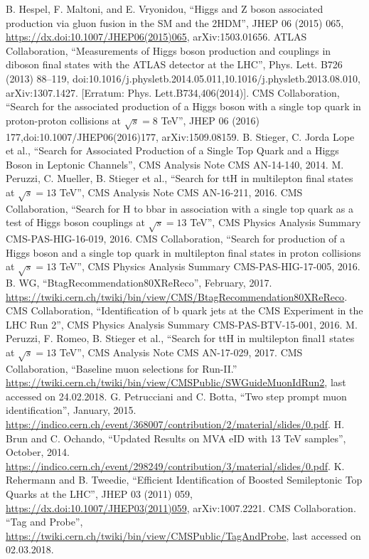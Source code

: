 \documentclass[print]{nuthesis}
\begin{document}
\begin{thebibliography}{300}
  
 B. Hespel, F. Maltoni, and E. Vryonidou, ``Higgs and Z boson associated production via gluon fusion in the SM and the 2HDM'', JHEP 06 (2015) 065, \url{https://dx.doi:10.1007/JHEP06(2015)065}, arXiv:1503.01656.
 ATLAS Collaboration, ``Measurements of Higgs boson production and couplings in diboson final states with the ATLAS detector at the LHC'', Phys. Lett. B726 (2013) 88–119, doi:10.1016/j.physletb.2014.05.011,10.1016/j.physletb.2013.08.010, arXiv:1307.1427. [Erratum: Phys. Lett.B734,406(2014)].
CMS Collaboration, ``Search for the associated production of a Higgs boson with a single top quark in proton-proton collisions at  $\sqrt{s}=8 $ TeV'', JHEP 06 (2016) 177,doi:10.1007/JHEP06(2016)177, arXiv:1509.08159.
B. Stieger, C. Jorda Lope et al., ``Search for Associated Production of a Single Top Quark and a Higgs Boson in Leptonic Channels'', CMS Analysis Note CMS AN-14-140, 2014.
M. Peruzzi, C. Mueller, B. Stieger et al., ``Search for ttH in multilepton final states at $\sqrt{s}=13$ TeV'', CMS Analysis Note CMS AN-16-211, 2016.
CMS Collaboration, ``Search for H to bbar in association with a single top quark as a test of Higgs boson couplings at $\sqrt{s}=13$ TeV'', CMS Physics Analysis Summary CMS-PAS-HIG-16-019, 2016.
CMS Collaboration, ``Search for production of a Higgs boson and a single top quark in multilepton final states in proton collisions at $\sqrt{s}=13$ TeV'', CMS Physics Analysis Summary CMS-PAS-HIG-17-005, 2016.
 B. WG, ``BtagRecommendation80XReReco'', February, 2017. \url{https://twiki.cern.ch/twiki/bin/view/CMS/BtagRecommendation80XReReco}.
 CMS Collaboration, ``Identification of b quark jets at the CMS Experiment in the LHC Run 2'', CMS Physics Analysis Summary CMS-PAS-BTV-15-001, 2016.
M. Peruzzi, F. Romeo, B. Stieger et al., ``Search for ttH in multilepton final1 states at $\sqrt{s}=13$ TeV'', CMS Analysis Note CMS AN-17-029, 2017.
 CMS Collaboration, ``Baseline muon selections for Run-II.'' \url{https://twiki.cern.ch/twiki/bin/view/CMSPublic/SWGuideMuonIdRun2}, last accessed on 24.02.2018.
 G. Petrucciani and C. Botta, ``Two step prompt muon identification'', January, 2015. \url{https://indico.cern.ch/event/368007/contribution/2/material/slides/0.pdf}.
 H. Brun and C. Ochando, ``Updated Results on MVA eID with 13 TeV samples'', October, 2014. \url{https://indico.cern.ch/event/298249/contribution/3/material/slides/0.pdf}.
 K. Rehermann and B. Tweedie, ``Efficient Identification of Boosted Semileptonic Top Quarks at the LHC'', JHEP 03 (2011) 059, \url{https://dx.doi:10.1007/JHEP03(2011)059}, arXiv:1007.2221.
 CMS Collaboration. ``Tag and Probe'', \url{https://twiki.cern.ch/twiki/bin/view/CMSPublic/TagAndProbe}, last accessed on 02.03.2018. 



\end{thebibliography}
\end{document}
